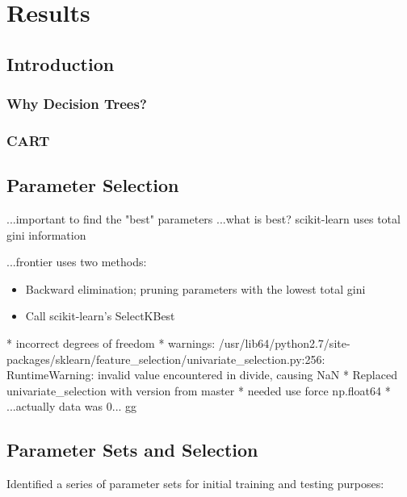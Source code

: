\chapter{Results}
\section{Introduction}
\subsection{Why Decision Trees?}
\subsection{CART}

\section{Parameter Selection}
...important to find the "best" parameters
...what is best? scikit-learn uses total gini information

...frontier uses two methods:
\begin{itemize}
    \item Backward elimination; pruning parameters with the lowest total gini
    \item Call scikit-learn's SelectKBest
\end{itemize}


* incorrect degrees of freedom
* warnings: /usr/lib64/python2.7/site-packages/sklearn/feature\_selection/univariate\_selection.py:256: RuntimeWarning: invalid value encountered in divide, causing NaN
* Replaced univariate\_selection with version from master
* needed use force np.float64
* ...actually data was 0... gg


\section{Parameter Sets and Selection}

Identified a series of parameter sets for initial training and testing purposes:

